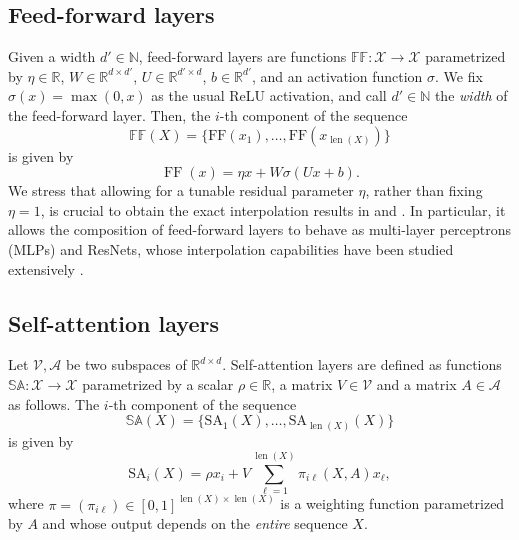 \documentclass[pdflatex,sn-mathphys-num]{sn-jnl}%
\theoremstyle{thmstyleone}%
\theoremstyle{thmstyletwo}%
\theoremstyle{thmstylethree}%
\numberwithin{equation}{section}
\newcommand{\R}{\mathbb{R}}
\newcommand{\N}{\mathbb{N}}
\DeclareMathOperator{\FF}{\mathrm{FF}}
\DeclareMathOperator{\len}{len}
\begin{document}
\subsection{Feed-forward layers} 
Given a width $d'\in \N$, feed-forward layers are functions $\mathbb{FF} : \mathcal{X} \to \mathcal{X}$ parametrized by $\eta \in \R$, $W \in \R^{d \times d'}$, $U \in \R^{d'\times d}$, $b\in \R^{d'}$, and an activation function $\sigma$. We fix $\sigma (x) = \max (0,x)$ as the usual ReLU activation, and call $d'\in \N$ the \textit{width} of the feed-forward layer. Then, the $i$-th component of the sequence 
\begin{equation*}
\mathbb{FF}(X) = \{ \mathrm{FF}(x_1), \dots, \mathrm{FF}(x_{\len(X)})\} 
\end{equation*}
is given by
\begin{equation*}
\FF (x) = \eta x + W\sigma(U x + b).
\end{equation*}
%
We stress that allowing for a tunable residual parameter $\eta$, rather than fixing $\eta = 1$, is crucial to obtain the exact interpolation results in  and . In particular, it allows the composition of feed-forward layers to behave as multi-layer perceptrons (MLPs) and ResNets, whose interpolation capabilities have been studied extensively \cite{hernandez2024deep,domenec2023NODES, alvarez2024interplay}.

\subsection{Self-attention layers}\label{sss:SAlayers}

Let $\mathcal{V}, \mathcal{A}$ be two subspaces of $\R^{d\times d}$. Self-attention layers are defined as functions $\mathbb{SA} :\mathcal{X} \to \mathcal{X}$ parametrized by a scalar $\rho \in \R$, a matrix $V\in \mathcal{V}$ and a matrix $A\in \mathcal{A}$ as follows. The $i$-th component of the sequence 
$$
\mathbb{SA}(X) = \{\mathrm{SA}_1(X),\dots, \mathrm{SA}_{\len(X)}(X)\}
$$
is given by
\begin{equation}
\label{eq:selfatt_a}
    \mathrm{SA}_i(X) = \rho x_i + V \sum_{\ell = 1}^{\len(X)} \pi_{i\ell} (X,A) x_\ell,
\end{equation}
where $\pi = (\pi_{i\ell}) \in [0,1]^{\len(X) \times \len(X)}$ is a weighting function parametrized by $A$ and whose output depends on the \textit{entire} sequence $X$.
\end{document}
